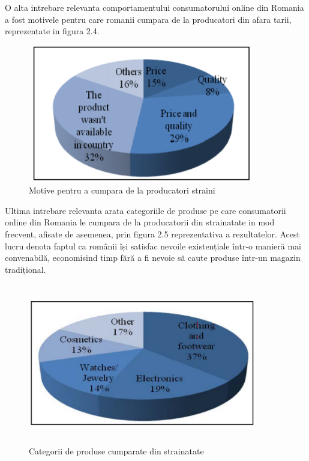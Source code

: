\documentclass[a4paper, 12pt]{article}
\begin{document}
	\qquad O alta intrebare relevanta comportamentului consumatorului online din Romania a fost motivele pentru care romanii cumpara de la producatori din afara tarii, reprezentate in figura 2.4.
	\begin{figure}[!htb]
		\centering
		\includegraphics[width=10cm, height=6cm]{"figures/seventh.png"}
		\caption{Motive pentru a cumpara de la producatori straini}\label{fig:seventh}
	\end{figure}
\newpage
	\quad Ultima intrebare relevanta arata categoriile de produse pe care consumatorii online din Romania le cumpara de la producatorii din strainatate in mod frecvent, afisate de asemenea, prin figura 2.5 reprezentativa a rezultatelor. Acest lucru denota faptul ca românii își satisfac nevoile existențiale într-o manieră mai convenabilă, economisind timp fără a fi nevoie să caute produse într-un magazin tradițional.
		\begin{figure}[!htb]
			\centering
			\includegraphics[width=10cm, height=7cm]{"figures/eigth.png"}
			\caption{Categorii de produse cumparate din strainatate}\label{fig:eigth}
		\end{figure}
	
		
\end{document}
